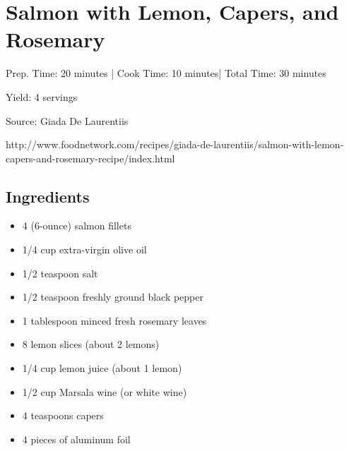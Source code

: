 \section{Salmon with Lemon, Capers, and Rosemary}

\begin{center}
Prep. Time: 20 minutes |
Cook Time: 10 minutes|
Total Time: 30 minutes
 
Yield: 4 servings

\vspace{1em}

Source: Giada De Laurentiis\par
http://www.foodnetwork.com/recipes/giada-de-laurentiis/salmon-with-lemon-capers-and-rosemary-recipe/index.html
\end{center}

\subsection{Ingredients}
\begin{multicols}{2}
\begin{itemize}
    \item 4 (6-ounce) salmon fillets
    \item 1/4 cup extra-virgin olive oil
    \item 1/2 teaspoon salt
    \item 1/2 teaspoon freshly ground black pepper
    \item 1 tablespoon minced fresh rosemary leaves
    \item 8 lemon slices (about 2 lemons)
    \item 1/4 cup lemon juice (about 1 lemon)
    \item 1/2 cup Marsala wine (or white wine)
    \item 4 teaspoons capers
    \item 4 pieces of aluminum foil
\end{itemize}
\end{multicols}

